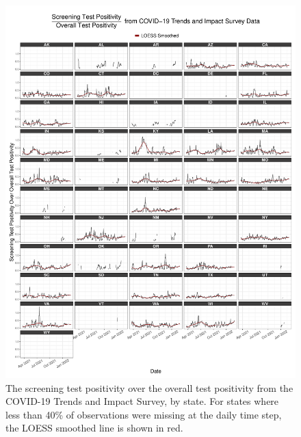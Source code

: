 \documentclass[12pt,twoside]{smiththesis}
\begin{document}
~
\begin{figure}
\includegraphics[width=1\linewidth]{figure/ctis_beta_states} \caption{\label{fig:statectis}The screening test positivity over the overall test positivity from the COVID-19 Trends and Impact Survey, by state. For states where less than 40\% of observations were missing at the daily time step, the LOESS smoothed line is shown in red.}\label{fig:unnamed-chunk-62}
\end{figure}
\end{document}
